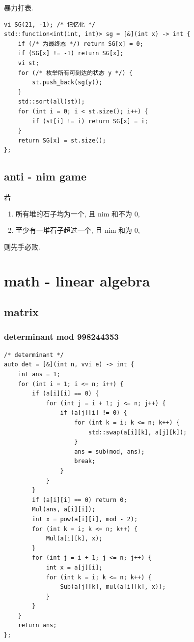 \documentclass[UTF8, a4paper, titlepage, twoside]{ctexart}
\begin{document}
暴力打表.
\begin{lstlisting}[style=cpp]
vi SG(21, -1); /* 记忆化 */
std::function<int(int, int)> sg = [&](int x) -> int {
    if (/* 为最终态 */) return SG[x] = 0;
    if (SG[x] != -1) return SG[x];
    vi st;
    for (/* 枚举所有可到达的状态 y */) {
        st.push_back(sg(y));
    }
    std::sort(all(st));
    for (int i = 0; i < st.size(); i++) {
        if (st[i] != i) return SG[x] = i;
    }
    return SG[x] = st.size();
};
\end{lstlisting}

\subsection{ anti - nim game }
若
\begin{enumerate}
    \item 所有堆的石子均为一个, 且 nim 和不为 0,
    \item 至少有一堆石子超过一个, 且 nim 和为 0,
\end{enumerate}
则先手必败.

\newpage
\section{ math - linear algebra}
\subsection{ matrix }
\subsubsection*{ determinant mod 998244353}
\begin{lstlisting}[style=cpp]
/* determinant */
auto det = [&](int n, vvi e) -> int {
    int ans = 1;
    for (int i = 1; i <= n; i++) {
        if (a[i][i] == 0) {
            for (int j = i + 1; j <= n; j++) {
                if (a[j][i] != 0) {
                    for (int k = i; k <= n; k++) {
                        std::swap(a[i][k], a[j][k]);
                    }
                    ans = sub(mod, ans);
                    break;
                }
            }
        }
        if (a[i][i] == 0) return 0;
        Mul(ans, a[i][i]);
        int x = pow(a[i][i], mod - 2);
        for (int k = i; k <= n; k++) {
            Mul(a[i][k], x);
        }
        for (int j = i + 1; j <= n; j++) {
            int x = a[j][i];
            for (int k = i; k <= n; k++) {
                Sub(a[j][k], mul(a[i][k], x));
            }
        }
    }
    return ans;
};
\end{lstlisting}
\end{document}
